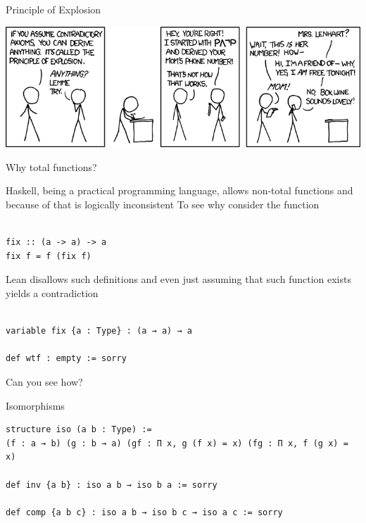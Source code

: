 \documentclass[pdf]{beamer}
\begin{document}
\begin{frame}{Principle of Explosion}
  \begin{center}
    \includegraphics[scale=0.48]{images/principle_of_explosion}
  \end{center}
\end{frame}

\begin{frame}[fragile]{Why total functions?}
  \begin{outline}
    \1 Haskell, being a practical programming language, allows non-total functions and because of that is logically inconsistent
    \1 To see why consider the function
    \\~\
    \begin{verbatim}
fix :: (a -> a) -> a
fix f = f (fix f)
    \end{verbatim}
    \pause
    \1 Lean disallows such definitions and even just assuming that such function exists yields a contradiction
    \\~\
    \begin{verbatim}
variable fix {a : Type} : (a → a) → a

def wtf : empty := sorry
    \end{verbatim}
    \1 Can you see how?
  \end{outline}
\end{frame}


\begin{frame}[fragile]{Isomorphisms}
  \begin{verbatim}
structure iso (a b : Type) :=
(f : a → b) (g : b → a) (gf : Π x, g (f x) = x) (fg : Π x, f (g x) = x)

def inv {a b} : iso a b → iso b a := sorry

def comp {a b c} : iso a b → iso b c → iso a c := sorry
  \end{verbatim}
\end{frame}
\end{document}
